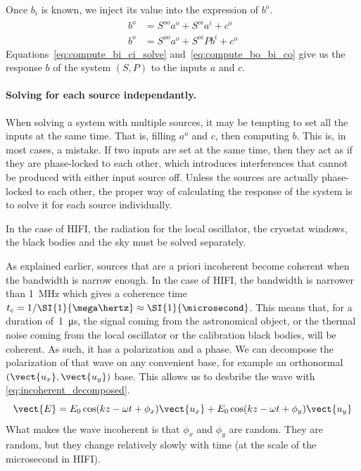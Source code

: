 Once $b_i$ is known, we inject its value into the expression of $b^o$.
\begin{subequations}
    \begin{align}
        b^o &= S^{oo} a^o + S^{oi} a^i + c^o \label{eq:compute_bo_ai_co}\\
        b^o &= S^{oo} a^o + S^{oi} Pb^i + c^o \label{eq:compute_bo_bi_co}
    \end{align}
    \label{eq:compute_bo_co}
\end{subequations}
Equations~\eqref{eq:compute_bi_ci_solve} and~\eqref{eq:compute_bo_bi_co} give us the response $b$ of the system $(S, P)$ to the inputs $a$ and $c$.


\paragraph{Solving for each source independantly.}
\label{solving_for_each_source_independantly}
When solving a system with multiple sources, it may be tempting to set all the inputs at the same time.
That is, filling $a^o$ and $c$, then computing $b$.
This is, in most cases, a mistake.
If two inputs are set at the same time, then they act as if they are phase-locked to each other, which introduces interferences that cannot be produced with either input source off.
Unless the sources are actually phase-locked to each other, the proper way of calculating the response of the system is to solve it for each source individually.

In the case of HIFI, the radiation for the local oscillator, the cryostat windows, the black bodies and the sky must be solved separately.

As explained earlier, sources that are a priori incoherent become coherent when the bandwidth is narrow enough.
In the case of HIFI, the bandwidth is narrower than \SI{1}{\mega\hertz}
which gives a coherence time $t_c = 1/\SI{1}{\mega\hertz} \approx \SI{1}{\microsecond}$.
This means that, for a duration of~\SI{1}{\micro\second}, the signal coming from the astronomical object, or the thermal noise coming from the local oscillator or the calibration black bodies, will be coherent.
As such, it has a polarization and a phase.
We can decompose the polarization of that wave on any convenient base, for example an orthonormal $(\vect{u_x}, \vect{u_y})$ base.
This allows us to desbribe the wave with \cref{eq:incoherent_decomposed}.
\begin{equation}
    \vect{E} = E_0 \cos(kz - \omega t + \phi_x) \vect{u_x}
             + E_0 \cos(kz - \omega t + \phi_y) \vect{u_y}
    \label{eq:incoherent_decomposed}
\end{equation}
What makes the wave incoherent is that $\phi_x$ and $\phi_y$ are random.
They are random, but they change relatively slowly with time (at the scale of the microsecond in HIFI).

